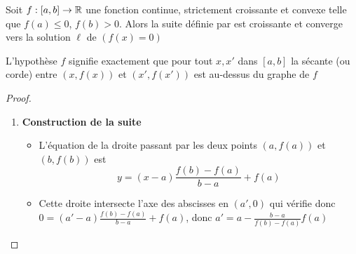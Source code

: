 \begin{frame}



\end{frame}

\begin{frame}
\begin{proposition}
 Soit $f : [a,b] \to \mathbb{R}$ une fonction continue, strictement croissante et convexe telle
 que $f(a) \le 0$, $f(b) > 0$.
 Alors la suite définie par
 est croissante et converge vers la solution $\ell$ de $(f(x)=0)$
\end{proposition}  
\end{frame}


\begin{frame}
L'hypothèse $f$  signifie exactement que 
pour tout $x,x'$ dans $[a,b]$ la sécante (ou corde) entre 
$(x,f(x))$ et $(x',f(x'))$ est au-dessus du graphe de $f$


\end{frame}


\begin{frame}
\begin{minipage}{0.62\textwidth}
\end{minipage}
\pause
\begin{minipage}{0.3\textwidth}
\end{minipage}
\vspace*{-3ex}
\pause
\begin{proof}
\begin{enumerate}
  \item \textbf{Construction de la suite}

  \pause
  
  \begin{itemize}
    \item L'équation de la droite passant par les deux points $(a,f(a))$ et $(b,f(b))$ est 
$$y=(x-a) \frac{f(b)-f(a)}{b-a} + f(a)$$

\pause

    \item Cette droite intersecte l'axe des abscisses en $(a',0)$ qui vérifie donc 
$0=(a'-a) \frac{f(b)-f(a)}{b-a} + f(a)$, donc $a'=a - \frac{b-a}{f(b)-f(a)}f(a)$ \qedhere
  \end{itemize}
\end{enumerate}
\end{proof}
\end{frame} 

